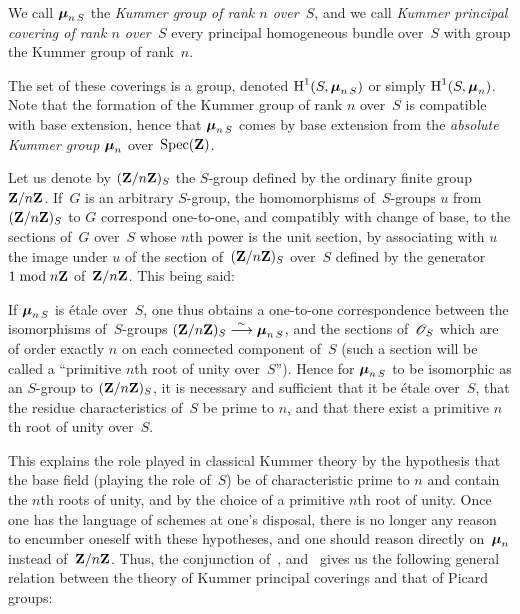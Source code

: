\begin{definition}
\label{XI.6.2}
We
call $\boldsymbol{\mu}_{n\,S}$ the \emph{Kummer group of rank $n$
over~$S$}, and we call \emph{Kummer principal covering
of rank
$n$ over~$S$}
every principal homogeneous bundle over~$S$ with group the
Kummer group of rank~$n$.
\end{definition}

The set of these coverings is a group, denoted
$\operatorname{H}^1(S,\boldsymbol{\mu}_{n\,S})$ or simply $\operatorname{H}^1(S,\boldsymbol{\mu}_n)$. Note that
the formation of the Kummer group of rank $n$ over~$S$ is
compatible with base extension, hence that $\boldsymbol{\mu}_{n\,S}$
comes by base extension from the \emph{absolute Kummer group
$\boldsymbol{\mu}_n$} over~$\operatorname{Spec}(\mathbf{Z})$.

Let us denote by $(\mathbf{Z}/n\mathbf{Z})_S$ the $S$-group defined by the
ordinary finite group $\mathbf{Z}/n\mathbf{Z}$. If~$G$ is an arbitrary $S$-group,
the homomorphisms of~$S$-groups $u$ from~$(\mathbf{Z}/n\mathbf{Z})_S$ to $G$
correspond one-to-one, and compatibly with
change of base, to the sections of~$G$ over~$S$ whose $n$th power
is the unit section, by associating with
$u$ the image under $u$ of the section of~$(\mathbf{Z}/n\mathbf{Z})_S$ over~$S$ defined
by the generator $1\bmod n\mathbf{Z}$ of~$\mathbf{Z}/n\mathbf{Z}$. This being said:

\begin{corollary}
\label{XI.6.3} If $\boldsymbol{\mu}_{n\,S}$ is \'etale over~$S$, one
thus obtains a one-to-one correspondence between the isomorphisms of~$S$-groups
$(\mathbf{Z}/n\mathbf{Z})_S\overset{\sim}{\longrightarrow}\boldsymbol{\mu}_{n\,S}$, and the sections of~$\cal{O}_S$
which are of order exactly $n$ on each connected component
of~$S$ (such a section will be called a ``primitive
$n$th root of unity over~$S$''). Hence for
$\boldsymbol{\mu}_{n\,S}$ to be isomorphic as an $S$-group to
$(\mathbf{Z}/n\mathbf{Z})_S$, it is necessary and sufficient that it be \'etale
over~$S$,
\ie that the residue characteristics of~$S$ be
prime to $n$, and that there exist a primitive
$n$th root of unity over~$S$.
\end{corollary}

This explains the role played in classical Kummer theory
by the hypothesis that the base field (playing the role
of~$S$) be of characteristic prime to $n$ and
contain the $n$th roots of unity, and by the choice
of a primitive $n$th root of unity. Once one
has the language of schemes at one's disposal, there is no longer any reason to
encumber oneself with these hypotheses, and one should reason directly
on~$\boldsymbol{\mu}_n$ instead of~$\mathbf{Z}/n\mathbf{Z}$. Thus, the conjunction
of~,  and~ gives us the following
general relation between the theory of Kummer principal
coverings and that of Picard groups:

